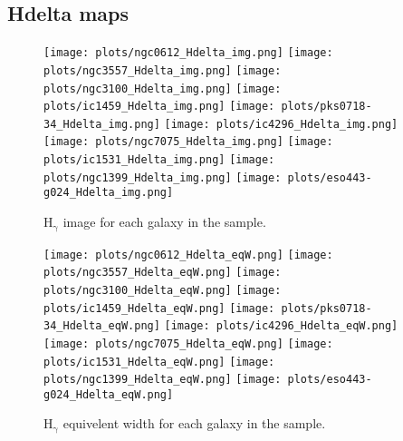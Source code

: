 \documentclass[fleqn,usenatbib,useAMS]{mnras}
\begin{document}
    \subsection{Hdelta maps}
        \label{subsec:Hdeltamaps}
        \begin{figure*}
            \centering
            \texttt{[image: plots/ngc0612\_Hdelta\_img.png]}
            \texttt{[image: plots/ngc3557\_Hdelta\_img.png]}
            \texttt{[image: plots/ngc3100\_Hdelta\_img.png]}
            \texttt{[image: plots/ic1459\_Hdelta\_img.png]}
            \texttt{[image: plots/pks0718-34\_Hdelta\_img.png]}
            \texttt{[image: plots/ic4296\_Hdelta\_img.png]}
            \texttt{[image: plots/ngc7075\_Hdelta\_img.png]}
            \texttt{[image: plots/ic1531\_Hdelta\_img.png]}
            \texttt{[image: plots/ngc1399\_Hdelta\_img.png]}
            \texttt{[image: plots/eso443-g024\_Hdelta\_img.png]}
            \caption{H$_\mathrm{\gamma}$ image for each galaxy in the sample.}
            \label{fig:Hdelta_img}
        \end{figure*}


        \begin{figure*}
            \centering
            \texttt{[image: plots/ngc0612\_Hdelta\_eqW.png]}
            \texttt{[image: plots/ngc3557\_Hdelta\_eqW.png]}
            \texttt{[image: plots/ngc3100\_Hdelta\_eqW.png]}
            \texttt{[image: plots/ic1459\_Hdelta\_eqW.png]}
            \texttt{[image: plots/pks0718-34\_Hdelta\_eqW.png]}
            \texttt{[image: plots/ic4296\_Hdelta\_eqW.png]}
            \texttt{[image: plots/ngc7075\_Hdelta\_eqW.png]}
            \texttt{[image: plots/ic1531\_Hdelta\_eqW.png]}
            \texttt{[image: plots/ngc1399\_Hdelta\_eqW.png]}
            \texttt{[image: plots/eso443-g024\_Hdelta\_eqW.png]}
            \caption{H$_\mathrm{\gamma}$ equivelent width for each galaxy in the sample.}
            \label{fig:Hdelta_eqW}
        \end{figure*}
\end{document}
